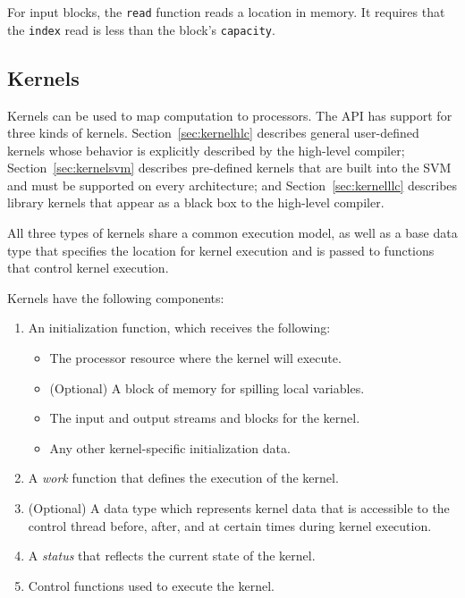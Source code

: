  For input blocks, the {\tt read} function reads a
location in memory.  It requires that the {\tt index} read is less
than the block's {\tt capacity}.

\subsection{Kernels}
\label{sec:kernel}

Kernels can be used to map computation to processors.  The API has
support for three kinds of kernels. Section~\ref{sec:kernelhlc}
describes general user-defined kernels whose behavior is explicitly
described by the high-level compiler; Section~\ref{sec:kernelsvm}
describes pre-defined kernels that are built into the SVM and must be
supported on every architecture; and Section~\ref{sec:kernelllc}
describes library kernels that appear as a black box to the high-level
compiler.

All three types of kernels share a common execution model, as well as
a base data type that specifies the location for kernel execution and
is passed to functions that control kernel execution.

Kernels have the following components:

\begin{enumerate}

\item An initialization function, which receives the following: 
\begin{itemize}
\item The processor resource where the kernel will execute. 
\item (Optional) A block of memory for spilling local variables. 
\item The input and output streams and blocks for the kernel. 
\item Any other kernel-specific initialization data. 
\end{itemize}

\item A {\it work} function that defines the execution of the kernel.

\item (Optional) A data type which represents kernel data that is
accessible to the control thread before, after, and at certain times
during kernel execution.

\item A {\it status} that reflects the current state of the kernel.

\item Control functions used to execute the kernel.

\end{enumerate}

